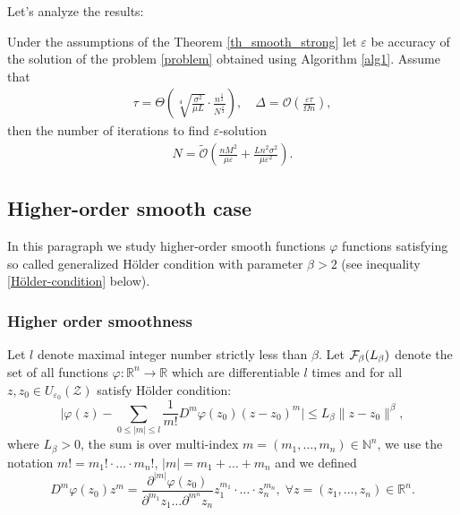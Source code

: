 \documentclass[runningheads]{llncs}
\def \R {\mathbb R}
\def\R{\mathbb{R}}
\def\R{\mathbb R}
\begin{document}
Let's analyze the results:
\begin{corollary} Under the assumptions of the Theorem \ref{th_smooth_strong} let $\varepsilon$ be accuracy of the solution of the problem \eqref{problem} obtained using Algorithm \ref{alg1}. Assume that
\begin{eqnarray*}
    \tau = \Theta \left( \sqrt[4]{\frac{\sigma^2}{\mu L}} \cdot \frac{n^{\frac{1}{2}}}{N^{\frac{1}{4}}}\right),\quad \Delta = \mathcal{O} \left(\frac{\varepsilon \tau}{\Omega n}\right),
\end{eqnarray*}
then the number of iterations to find $\varepsilon$-solution
\begin{eqnarray*}
    N = \widetilde{\mathcal{O}} \left( \frac{n M^2}{\mu \varepsilon} + \frac{Ln ^2 \sigma^2}{\mu \varepsilon^2} \right).
\end{eqnarray*}
\end{corollary}

\subsection{Higher-order smooth case}\label{33}



In this paragraph we study higher-order smooth functions $\varphi$ functions satisfying so called generalized Hölder condition with parameter $\beta > 2$ (see inequality \eqref{Hölder-condition} below). 

\subsubsection{Higher order smoothness}

Let $l$ denote maximal integer number strictly less than $\beta$. Let ${\cal F}_{\beta}(L_\beta)$ denote the set of all functions $\varphi: \mathbb{R}^n \rightarrow \mathbb{R}$ which are differentiable $l$ times and for all $z,z_0\in U_{\varepsilon_0} (\mathcal{Z})$ satisfy Hölder condition:
\begin{equation}\label{Hölder-condition}
    \Biggl| \varphi(z) - \sum_{0\leq|m|\leq l} \dfrac{1}{m!} D^m \varphi(z_0) (z-z_0)^m \Biggr| \leq L_\beta\|z-z_0\|^{\beta},
\end{equation}
where $L_\beta>0$, the sum is over multi-index $m=(m_1, \dots, m_n) \in \mathbb{N}^n$, we use the notation $m! = m_1! \cdot \dots \cdot m_n!$, $|m| = m_1 + \dots + m_n$ and we defined
\begin{equation*}
     D^m \varphi(z_0) z^m = \dfrac{\partial^{|m|} \varphi(z_0)}{\partial^{m_1} z_1  \dots \partial^{m^n} z_n} z_1^{m_1} \cdot \dots \cdot z_n^{m_n}, \; \forall z=(z_1, \dots, z_n) \in \R^n.
\end{equation*}
\end{document}

